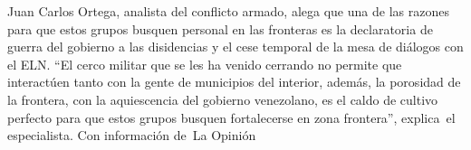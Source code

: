 \documentclass{article}%
\begin{document}
\newline%
%
Juan Carlos Ortega, analista del conflicto armado, alega que una de las razones para que estos grupos busquen personal en las fronteras es la declaratoria de guerra del gobierno a las disidencias y el cese temporal de la mesa de diálogos con el ELN.%
\newline%
%
“El cerco militar que se les ha venido cerrando no permite que interactúen tanto con la gente de municipios del interior, además, la porosidad de la frontera, con la aquiescencia del gobierno venezolano, es el caldo de cultivo perfecto para que estos grupos busquen fortalecerse en zona frontera”, explica~el especialista.%
\newline%
%
Con información de~La Opinión%
\newline%
%
\end{document}
